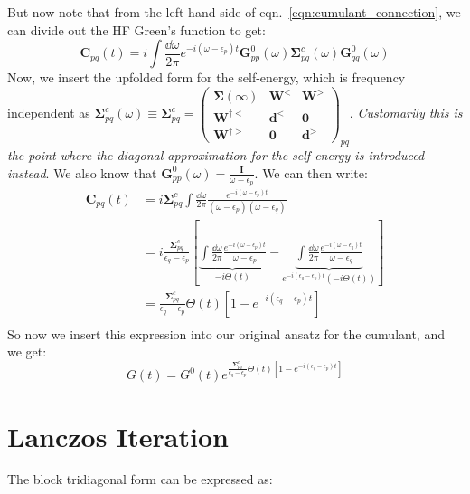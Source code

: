 But now note that from the left hand side of eqn.~\ref{eqn:cumulant_connection}, we can divide out the HF Green's function to get:
\begin{equation}
    \bm{C}_{pq}(t) = i \int \frac{\dd \omega}{2\pi} e^{-i\left(\omega - \epsilon_p\right)t} \bm{G}_{pp}^{0}(\omega) \bm{\Sigma}_{pq}^c(\omega)\bm{G}_{qq}^{0}(\omega)
\end{equation}
Now, we insert the upfolded form for the self-energy, which is frequency independent as $\bm{\Sigma}_{pq}^c(\omega) \equiv \bm{\Sigma}_{pq}^c = \begin{pmatrix} \bm{\Sigma}(\infty) & \bm{W}^< & \bm{W}^> \\ \bm{W}^{\dagger<} & \bm{d}^< & \bm{0} \\ \bm{W}^{\dagger>} & \bm{0} & \bm{d}^> \end{pmatrix}_{pq}$. \emph{Customarily this is the point where the diagonal approximation for the self-energy is introduced instead}. We also  know that $\bm{G}_{pp}^{0}(\omega) = \frac{\bm{I}}{\omega - \epsilon_p}$. We can then write:
\begin{align}
    \bm{C}_{pq}(t) &= i \bm{\Sigma}_{pq}^c \int \frac{\dd \omega}{2\pi} \frac{e^{-i\left(\omega - \epsilon_p\right)t}}{\left(\omega-\epsilon_p\right)\left(\omega-\epsilon_q\right)} \\
    &= i \frac{\bm{\Sigma}_{pq}^c}{\epsilon_q - \epsilon_p} \left[ \underbrace{\int \frac{\dd \omega}{2\pi} \frac{e^{-i\left(\omega - \epsilon_p\right)t}}{\omega - \epsilon_p}}_{-i\Theta(t)} - \underbrace{\int \frac{\dd \omega}{2\pi} \frac{e^{-i\left(\omega - \epsilon_q\right)t}}{\omega - \epsilon_q}}_{e^{-i\left(\epsilon_q - \epsilon_p\right)t}\left(-i\Theta(t)\right)} \right] \\
    &= \frac{\bm{\Sigma}_{pq}^c}{\epsilon_q - \epsilon_p} \Theta(t) \left[1-e^{-i\left(\epsilon_q - \epsilon_p\right)t}\right] \\
\end{align}
So now we insert this expression into our original ansatz for the cumulant, and we get:
\begin{equation}
    G(t) = G^0(t)e^{\frac{\bm{\Sigma}_{pq}^c}{\epsilon_q - \epsilon_p} \Theta(t) \left[1-e^{-i\left(\epsilon_q - \epsilon_p\right)t}\right]}
\end{equation}
\section{Lanczos Iteration}
The block tridiagonal form can be expressed as:

